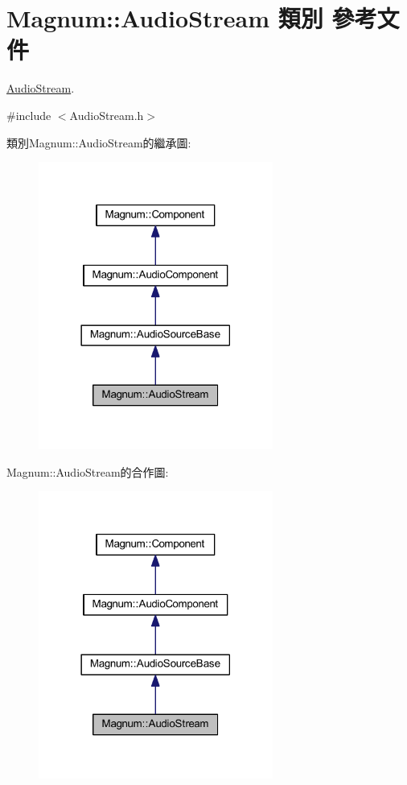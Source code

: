 \hypertarget{class_magnum_1_1_audio_stream}{}\section{Magnum\+:\+:Audio\+Stream 類別 參考文件}
\label{class_magnum_1_1_audio_stream}


\hyperlink{class_magnum_1_1_audio_stream}{Audio\+Stream}.  




{\ttfamily \#include $<$Audio\+Stream.\+h$>$}



類別\+Magnum\+:\+:Audio\+Stream的繼承圖\+:\nopagebreak
\begin{figure}[H]
\begin{center}
\leavevmode
\includegraphics[width=218pt]{class_magnum_1_1_audio_stream__inherit__graph}
\end{center}
\end{figure}


Magnum\+:\+:Audio\+Stream的合作圖\+:\nopagebreak
\begin{figure}[H]
\begin{center}
\leavevmode
\includegraphics[width=218pt]{class_magnum_1_1_audio_stream__coll__graph}
\end{center}
\end{figure}
